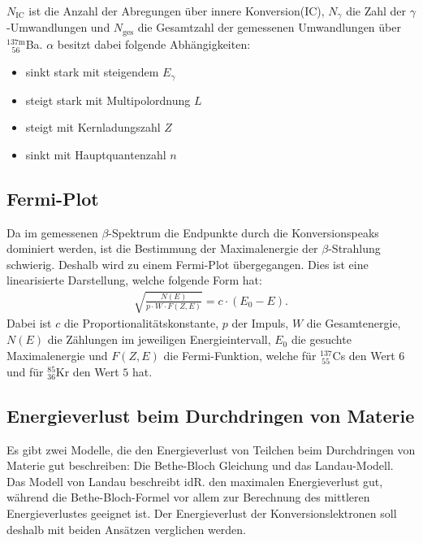 \documentclass[german,  %
parskip=full,  %
]{scrartcl}
\begin{document}
$N_{\mathrm{IC}}$ ist die Anzahl der Abregungen über innere Konversion(IC), $N_{\gamma}$ die Zahl der $\gamma$-Umwandlungen und $N_{\text{ges}}$ die Gesamtzahl der gemessenen Umwandlungen über $^{137\mathrm{m}}_{\ \ \ 56}$Ba. $\alpha$ besitzt dabei folgende Abhängigkeiten:
\begin{itemize}
\item sinkt stark mit steigendem $E_{\gamma}$
\item steigt stark mit Multipolordnung $L$
\item steigt mit Kernladungszahl $Z$
\item sinkt mit Hauptquantenzahl $n$
\end{itemize}

\subsection{Fermi-Plot}
Da im gemessenen $\beta$-Spektrum die Endpunkte durch die Konversionspeaks dominiert werden, ist die Bestimmung der Maximalenergie der $\beta$-Strahlung schwierig. Deshalb wird zu einem Fermi-Plot übergegangen. Dies ist eine linearisierte Darstellung, welche folgende Form hat:
\begin{align*}
\sqrt{\frac{N(E)}{p \cdot W \cdot F(Z,E)}} = c \cdot (E_0-E).
\end{align*}
Dabei ist $c$ die Proportionalitätskonstante, $p$ der Impuls, $W$ die Gesamtenergie, $N(E)$ die Zählungen im jeweiligen Energieintervall, $E_0$ die gesuchte Maximalenergie und $F(Z,E)$ die Fermi-Funktion, welche für $^{137}_{\ 55}$Cs den Wert $6$ und für $^{85}_{36}$Kr den Wert $5$ hat.

\subsection{Energieverlust beim Durchdringen von Materie}
Es gibt zwei Modelle, die den Energieverlust von Teilchen beim Durchdringen von Materie gut beschreiben: Die Bethe-Bloch Gleichung und das Landau-Modell. Das Modell von Landau beschreibt idR. den maximalen Energieverlust gut, während die Bethe-Bloch-Formel vor allem zur Berechnung des mittleren Energieverlustes geeignet ist. 
Der Energieverlust der Konversionslektronen soll deshalb mit beiden Ansätzen verglichen werden.
\end{document}
